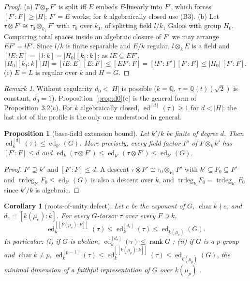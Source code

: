 \documentclass[11pt]{amsart}
\newtheorem{proposition}[theorem]{Proposition}
\newtheorem{corollary}[theorem]{Corollary}
\theoremstyle{definition}
\theoremstyle{remark}
\newtheorem{remark}[theorem]{Remark}
\newcommand{\ed}{\operatorname{ed}}
\newcommand{\edd}[1]{\ed^{[#1]}}
\newcommand{\tr}{\operatorname{trdeg}}
\newcommand{\Q}{\mathbb Q}
\newcommand{\stag}[1]{\hfill{\normalfont[#1]}}
\begin{document}
\begin{proof}
(a) $T\otimes_FF'$ is split iff $E$ embeds $F$-linearly into $F'$, which forces
$[F':F]\ge|H|$; $F'=E$ works; for $k$ algebraically closed use (B3).
(b) Let $\tau\otimes F'\cong\tau_0\otimes_{k_1}F'$ with $\tau_0$ over $k_1$, of
splitting field $l/k_1$ Galois with group $H_0$. Comparing total spaces inside an
algebraic closure of $F'$ we may arrange $EF'=lF'$. Since $l/k$ is finite separable
and $E/k$ regular, $l\otimes_kE$ is a field and $[lE:E]=[l:k]=|H_0|[k_1:k]$; as
$lE\subseteq EF'$,
\[
|H_0|[k_1:k]\,|H|=[lE:E][E:F]\le[EF':F]=[lF':F'][F':F]\le|H_0|\,[F':F].
\]
(c) $E=L$ is regular over $k$ and $H=G$.
\end{proof}

\begin{remark}
Without regularity $d_0<|H|$ is possible ($k=\Q$, $\tau=\Q(t)(\sqrt2)$ is constant,
$d_0=1$). Proposition~\ref{prop:d0}(c) is the general form of Proposition~3.2(c). For
$k$ algebraically closed, $\edd d(\tau)\ge1$ for $d<|H|$: the last slot of the profile
is the only one understood in general.
\end{remark}

\begin{proposition}[base-field extension bound]\label{prop:bfe}
Let $k'/k$ be finite of degree $d$. Then $\edd d_k(\tau)\le\ed_{k'}(G)$. More
precisely, every field factor $F'$ of $F\otimes_kk'$ has $[F':F]\le d$ and
$\ed_k(\tau\otimes F')\le\ed_{k'}(\tau\otimes F')\le\ed_{k'}(G)$.
\stag{proved}
\end{proposition}

\begin{proof}
$F'\supseteq k'$ and $[F':F]\le d$. A descent $\tau\otimes F'\cong\tau_0\otimes_{F_0}
F'$ with $k'\subseteq F_0\subseteq F'$ and $\tr_{k'}F_0\le\ed_{k'}(G)$ is also a
descent over $k$, and $\tr_kF_0=\tr_{k'}F_0$ since $k'/k$ is algebraic.
\end{proof}

\begin{corollary}[roots-of-unity defect]\label{cor:rou}
Let $e$ be the exponent of $G$, $\operatorname{char}k\nmid e$, and
$d_e=[k(\mu_e):k]$. For every $G$-torsor $\tau$ over every $F\supseteq k$,
\[
\edd{[F(\mu_e):F]}_k(\tau)\le\edd{d_e}_k(\tau)\le\ed_{k(\mu_e)}(G).
\]
In particular: (i) if $G$ is abelian, $\edd{d_e}_k(\tau)\le\operatorname{rank}G$
\cite{BR}; (ii) if $G$ is a $p$-group and $\operatorname{char}k\ne p$,
$\edd{p-1}_k(\tau)\le\edd{[k(\mu_p):k]}_k(\tau)\le\ed_{k(\mu_p)}(G)$, the minimal
dimension of a faithful representation of $G$ over $k(\mu_p)$ \cite{KM}.
\stag{proved; the values are cited}
\end{corollary}
\end{document}
